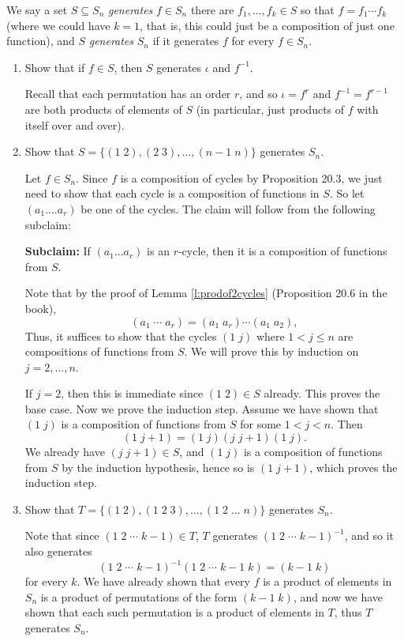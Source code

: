 \documentclass[11pt,dvipsnames]{book}
\numberwithin{equation}{section} %
\numberwithin{figure}{section} %
\numberwithin{table}{section} %
\begin{document}
\begin{exercise} We say a set $S\subseteq S_n$ {\it generates} $f\in S_{n}$ there are $f_{1},...,f_{k}\in S$ so that $f=f_{1}\cdots f_{k}$ (where we could have $k=1$, that is, this could just be a composition of just one function), and $S$ {\it generates} $S_{n}$ if it generates $f$ for every $f\in S_{n}$.

\begin{enumerate}
\item Show that if $f\in S$, then $S$ generates $\iota$ and $f^{-1}$.
\begin{solution}
Recall that each permutation has an order $r$, and so $\iota = f^{r}$ and $f^{-1} = f^{r-1}$ are both products of elements of $S$ (in particular, just products of $f$ with itself over and over). 
\end{solution}
\item Show that $S=\{ (1\; 2), (2 \; 3),...,(n-1 \; n)\}$ generates $S_{n}$. 
\begin{solution}
Let $f\in S_{n}$. Since $f$ is a composition of cycles by Proposition 20.3, we just need to show that each cycle is a composition of functions in $S$. So let $(a_{1}....a_{r})$ be one of the cycles. The claim will follow from the following subclaim:

{\bf Subclaim:} If $(a_{1}...a_{r})$ is an $r$-cycle, then it is a composition of functions from $S$.
 
Note that by the proof of Lemma \ref{l:prodof2cycles} (Proposition 20.6 in the book),
\[
(a_{1}\; \cdots \; a_{r}) = (a_{1} \; a_{r})\cdots (a_{1}\; a_{2}),
\]
Thus, it suffices to show that the cycles $(1 \; j)$ where $1<j\leq n$ are compositions of functions from $S$. We will prove this by induction on $j=2,...,n$.

If $j=2$, then this is immediate since $(1\;2)\in S$ already. This proves the base case. Now we prove the induction step. Assume we have shown that $(1\; j)$ is a composition of functions from $S$ for some $1<j<n$. Then
\[
(1 \; j+1) = (1 \; j)(j\; j+1)(1 \; j).
\]
We already have $(j\; j+1)\in S$, and $(1\; j)$ is a composition of functions from $S$ by the induction hypothesis, hence so is $(1 \; j+1)$, which proves the induction step. 
\end{solution}
\item Show that $T=\{(1\; 2),(1\; 2 \; 3),..., (1 \; 2 \; ...\; n)\}$ generates $S_{n}$.




\begin{solution}
Note that since $(1 \; 2 \; \cdots \; k-1 )\in T$, $T$ generates $(1 \; 2 \; \cdots \; k-1 )^{-1}$, and so it also generates
\[
(1 \; 2 \; \cdots \; k-1 )^{-1} (1 \; 2 \; \cdots \; k-1 \; k)  
=(k-1 \; k)
\]
for every $k$. We have already shown that every $f$ is a product of elements in $S_{n}$ is a product of permutations of the form $(k-1\; k)$, and now we have shown that each such permutation is a product of elements in $T$, thus $T$ generates $S_n$.
\end{solution}


\end{enumerate}
\end{exercise}
\end{document}
